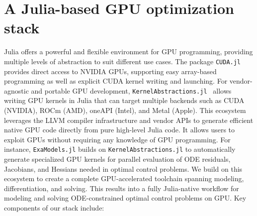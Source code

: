 



\section{A Julia-based GPU optimization stack}
Julia offers a powerful and flexible environment for GPU programming, providing multiple levels of abstraction to suit different use cases.
The package \texttt{CUDA.jl}~\cite{besard2018juliagpu,besard2019prototyping} provides direct access to NVIDIA GPUs, supporting easy array-based programming as well as explicit CUDA kernel writing and launching.
%
For vendor-agnostic and portable GPU development, \texttt{KernelAbstractions.jl}~\cite{Churavy_KernelAbstractions_jl} allows writing GPU kernels in Julia that can target multiple backends such as CUDA (NVIDIA), ROCm (AMD), oneAPI (Intel), and Metal (Apple).
%
This ecosystem leverages the LLVM compiler infrastructure and vendor APIs to generate efficient native GPU code directly from pure high-level Julia code.
It allows users to exploit GPUs without requiring any knowledge of GPU programming.
For instance, \texttt{ExaModels.jl} builds on \texttt{KernelAbstractions.jl} to automatically generate specialized GPU kernels for parallel evaluation of ODE residuals, Jacobians, and Hessians needed in optimal control problems.
%
We build on this ecosystem to create a complete GPU-accelerated toolchain spanning modeling, differentiation, and solving.
This results into a fully Julia-native workflow for modeling and solving ODE-constrained optimal control problems on GPU.
%
Key components of our stack include:

